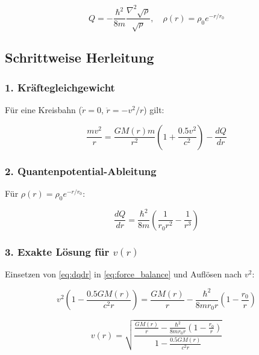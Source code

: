 \begin{equation}
Q = -\frac{\hbar^2}{8m}\frac{\nabla^2\sqrt{\rho}}{\sqrt{\rho}}, \quad \rho(r) = \rho_0 e^{-r/r_0}
\label{eq:qpotential}
\end{equation}

\subsection{Schrittweise Herleitung}
\subsubsection{1. Kräftegleichgewicht}
Für eine Kreisbahn ($\dot{r} = 0$, $\ddot{r} = -v^2/r$) gilt:

\begin{equation}
\frac{mv^2}{r} = \frac{GM(r)m}{r^2}\left(1 + \frac{0.5v^2}{c^2}\right) - \frac{dQ}{dr}
\label{eq:force_balance}
\end{equation}

\subsubsection{2. Quantenpotential-Ableitung}
Für $\rho(r) = \rho_0 e^{-r/r_0}$:

\begin{equation}
\frac{dQ}{dr} = \frac{\hbar^2}{8m}\left(\frac{1}{r_0 r^2} - \frac{1}{r^3}\right)
\label{eq:dqdr}
\end{equation}

\subsubsection{3. Exakte Lösung für $v(r)$}
Einsetzen von \eqref{eq:dqdr} in \eqref{eq:force_balance} und Auflösen nach $v^2$:

\begin{equation}
v^2\left(1 - \frac{0.5GM(r)}{c^2 r}\right) = \frac{GM(r)}{r} - \frac{\hbar^2}{8m r_0 r}\left(1 - \frac{r_0}{r}\right)
\label{eq:v2_intermediate}
\end{equation}

\begin{equation}
v(r) = \sqrt{\frac{\frac{GM(r)}{r} - \frac{\hbar^2}{8m r_0 r}\left(1 - \frac{r_0}{r}\right)}{1 - \frac{0.5GM(r)}{c^2 r}}}
\label{eq:vfinal}
\end{equation}
